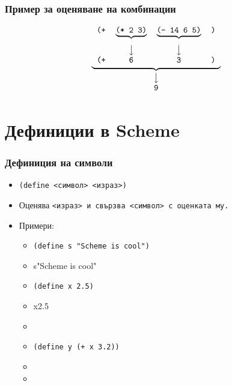 \documentclass{beamer}
\begin{document}
\begin{frame}[fragile]
  \frametitle{Пример за оценяване на комбинации}
  \begin{equation*}
    \underbrace{%
      \begin{tabular}{cccc}
        \tt{(+}&$\underbrace{\tt{(* 2 3)}}_{}$&$\underbrace{\tt{(- 14 6 5)}}_{}$&\tt)\\
               &\bda&\bda&\\
        \tt{(+}&\tt{6}&\tt{3}&\tt)
      \end{tabular}
    }_{%
      \begin{tabular}{c}
        \bda\\
        \tt 9
      \end{tabular}}
  \end{equation*}

  \vspace{2em}
  \begin{center}
  \end{center}
\end{frame}

\section{Дефиниции в Scheme}

\begin{frame}
  \frametitle{Дефиниция на символи}

  \begin{itemize}[<+->]
  \item \tt{\alert{(define} <символ> <израз>\alert)}
  \item Оценява \tt{<израз>} и свързва \tt{<символ>} с оценката му.
  \item Примери:
    \begin{itemize}
    \item \tt{(define s "Scheme is cool")}
    \item \evalsto s{"Scheme is cool"}
    \item \tt{(define x 2.5)}
    \item \evalsto x{2.5}
    \item {}
    \item \tt{(define y (+ x 3.2))}
    \item {}
    \item {}
    \end{itemize}
  \end{itemize}
\end{frame}
\end{document}

